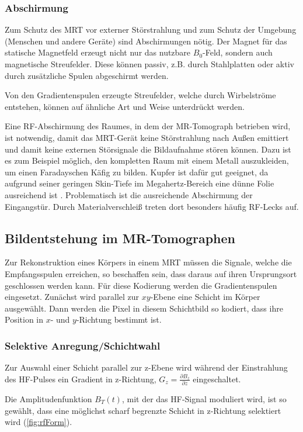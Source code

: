 \subsubsection{Abschirmung}
Zum Schutz des MRT vor externer Störstrahlung und zum Schutz der Umgebung (Menschen und andere Geräte) sind Abschirmungen nötig.
Der Magnet für das statische Magnetfeld erzeugt nicht nur das nutzbare $B_0$-Feld, sondern auch magnetische Streufelder. Diese können passiv, z.B. durch Stahlplatten oder aktiv durch zusätzliche Spulen abgeschirmt werden.

Von den Gradientenspulen erzeugte Streufelder, welche durch Wirbelströme entstehen, können auf ähnliche Art und Weise unterdrückt werden.

Eine RF-Abschirmung des Raumes, in dem der MR-Tomograph betrieben wird, ist notwendig, damit das MRT-Gerät keine Störstrahlung nach Außen emittiert und damit keine externen Störsignale die Bildaufnahme stören können.
Dazu ist es zum Beispiel möglich, den kompletten Raum mit einem Metall auszukleiden, um einen Faradayschen Käfig zu bilden. Kupfer ist dafür gut geeignet, da aufgrund seiner geringen Skin-Tiefe im Megahertz-Bereich eine dünne Folie ausreichend ist \cite{Weibler1993}. Problematisch ist die ausreichende Abschirmung der Eingangstür. Durch Materialverschleiß treten dort besonders häufig RF-Lecks auf.

\subsection{Bildentstehung im MR-Tomographen}
Zur Rekonstruktion eines Körpers in einem MRT müssen die Signale, welche die Empfangsspulen erreichen, so beschaffen sein, dass daraus auf ihren Ursprungsort geschlossen werden kann. Für diese Kodierung werden die Gradientenspulen eingesetzt. Zunächst wird parallel zur $xy$-Ebene eine Schicht im Körper ausgewählt. Dann werden die Pixel in diesem Schichtbild so kodiert, dass ihre Position in $x$- und $y$-Richtung bestimmt ist.

\subsubsection{Selektive Anregung/Schichtwahl}
Zur Auswahl einer Schicht parallel zur z-Ebene wird während der Einstrahlung des HF-Pulses ein Gradient in z-Richtung, $G_z=\frac{\partial B_z}{\partial z}$ eingeschaltet.

Die Amplitudenfunktion $B_T(t)$, mit der das HF-Signal moduliert wird, ist so gewählt, dass eine möglichst scharf begrenzte Schicht in z-Richtung selektiert wird (\autoref{fig:rfForm}).

